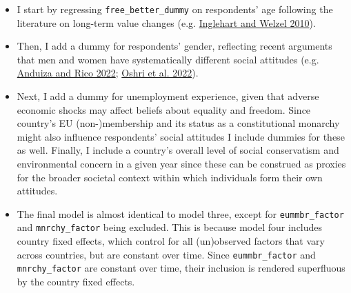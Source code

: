 \documentclass[
]{article}
\begin{document}
\begin{itemize}
\item
  I start by regressing \texttt{free\_better\_dummy} on respondents' age
  following the literature on long-term value changes (e.g.
  \protect\hyperlink{ref-inglehart2010changing}{Inglehart and Welzel
  2010}).
\item
  Then, I add a dummy for respondents' gender, reflecting recent
  arguments that men and women have systematically different social
  attitudes (e.g. \protect\hyperlink{ref-anduiza2022sexism}{Anduiza and
  Rico 2022}; \protect\hyperlink{ref-oshri2022risk}{Oshri et al. 2022}).
\item
  Next, I add a dummy for unemployment experience, given that adverse
  economic shocks may affect beliefs about equality and freedom. Since
  country's EU (non-)membership and its status as a constitutional
  monarchy might also influence respondents' social attitudes I include
  dummies for these as well. Finally, I include a country's overall
  level of social conservatism and environmental concern in a given year
  since these can be construed as proxies for the broader societal
  context within which individuals form their own attitudes.
\item
  The final model is almost identical to model three, except for
  \texttt{eummbr\_factor} and \texttt{mnrchy\_factor} being excluded.
  This is because model four includes country fixed effects, which
  control for all (un)observed factors that vary across countries, but
  are constant over time. Since \texttt{eummbr\_factor} and
  \texttt{mnrchy\_factor} are constant over time, their inclusion is
  rendered superfluous by the country fixed effects.
\end{itemize}
\end{document}
